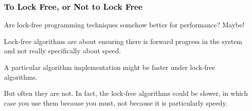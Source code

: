 \begin{frame}
\frametitle{To Lock Free, or Not to Lock Free}

Are lock-free programming techniques somehow better for performance? Maybe!

Lock-free algorithms are about ensuring there is forward progress in the system and not really specifically about speed. 

A particular algorithm implementation might be faster under lock-free algorithms.

But often they are not. In fact, the lock-free algorithms could be slower, in which case you use them because you must, not because it is particularly speedy.

\end{frame}




